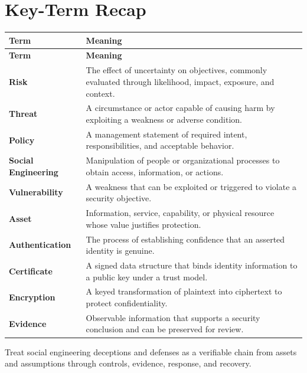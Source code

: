 \documentclass[11pt]{article}
\begin{document}
\section*{Key-Term Recap}
\begin{longtable}{>{\RaggedRight\arraybackslash}p{}>{\RaggedRight\arraybackslash}p{}}
\toprule\rowcolor{Navy}\color{white}\textbf{Term} & \color{white}\textbf{Meaning}\\\midrule
\endfirsthead
\toprule\rowcolor{Navy}\color{white}\textbf{Term} & \color{white}\textbf{Meaning}\\\midrule
\endhead
\textbf{Risk} & The effect of uncertainty on objectives, commonly evaluated through likelihood, impact, exposure, and context. \\\midrule
\textbf{Threat} & A circumstance or actor capable of causing harm by exploiting a weakness or adverse condition. \\\midrule
\textbf{Policy} & A management statement of required intent, responsibilities, and acceptable behavior. \\\midrule
\textbf{Social Engineering} & Manipulation of people or organizational processes to obtain access, information, or actions. \\\midrule
\textbf{Vulnerability} & A weakness that can be exploited or triggered to violate a security objective. \\\midrule
\textbf{Asset} & Information, service, capability, or physical resource whose value justifies protection. \\\midrule
\textbf{Authentication} & The process of establishing confidence that an asserted identity is genuine. \\\midrule
\textbf{Certificate} & A signed data structure that binds identity information to a public key under a trust model. \\\midrule
\textbf{Encryption} & A keyed transformation of plaintext into ciphertext to protect confidentiality. \\\midrule
\textbf{Evidence} & Observable information that supports a security conclusion and can be preserved for review. \\\midrule
\bottomrule
\end{longtable}
\begin{takeawaybox}
Treat social engineering deceptions and defenses as a verifiable chain from assets and assumptions through controls, evidence, response, and recovery.
\end{takeawaybox}
\end{document}
